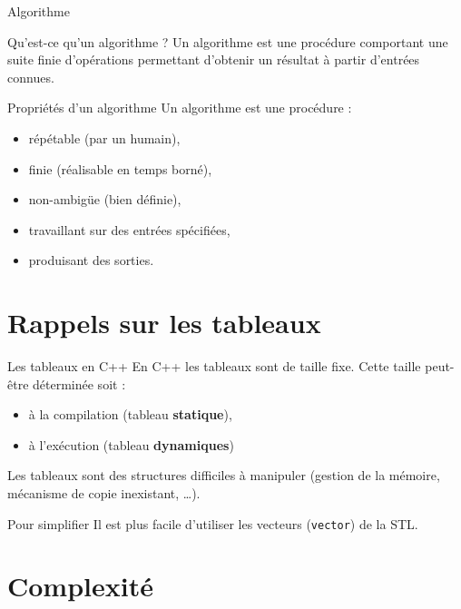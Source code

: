 \documentclass{beamer}
\begin{document}
\begin{frame}{Algorithme}

\begin{block}{Qu'est-ce qu'un algorithme ?}
Un algorithme est une procédure comportant une suite finie d'opérations permettant d'obtenir un résultat à partir d'entrées connues.
\end{block}

\begin{block}{Propriétés d'un algorithme}
Un algorithme est une procédure :
    \begin{itemize}
        \item répétable (par un humain),
        \item finie (réalisable en temps borné),
        \item non-ambigüe (bien définie),
        \item travaillant sur des entrées spécifiées,
        \item produisant des sorties.
    \end{itemize}
\end{block}

\end{frame}


\section{Rappels sur les tableaux}

\begin{frame}{Les tableaux en C++}
En C++ les tableaux sont de taille fixe. Cette taille peut-être déterminée soit :
\begin{itemize}
    \item à la compilation (tableau \textbf{statique}),
    \item à l'exécution (tableau \textbf{dynamiques})
\end{itemize}
Les tableaux sont des structures difficiles à manipuler (gestion de la mémoire, mécanisme de copie inexistant, \dots).

\begin{exampleblock}{Pour simplifier}
Il est plus facile d'utiliser les vecteurs (\texttt{vector}) de la STL.
\end{exampleblock}

\end{frame}

\section{Complexité}
\end{document}
